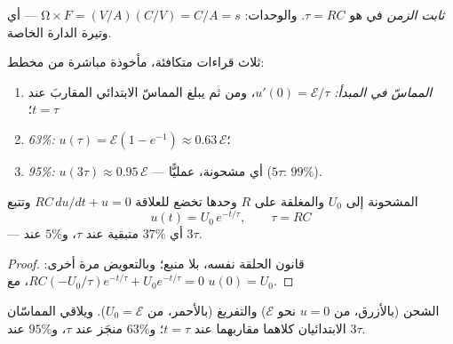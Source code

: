 \begin{definition}\label{def:g12:rc-rl-circuits:tau}
\emph{ثابت الزمن} في  هو
$\tau = RC$. والوحدات: $\unit{\ohm} \times \unit{F} =
(\unit{V/A})(\unit{C/V}) = \unit{C/A} = \unit{s}$ --- أي وتيرة
الدارة الخاصة.
\end{definition}

\begin{method}\label{met:g12:rc-rl-circuits:reading}
ثلاث قراءات متكافئة، مأخوذة مباشرة من مخطط:
\begin{enumerate}
  \item \emph{المماسّ في المبدأ:} $u'(0) = \mathcal{E}/\tau$، ومن ثم
        يبلغ المماسّ الابتدائي المقاربَ عند $t = \tau$؛
  \item \emph{63\%:} $u(\tau) = \mathcal{E}(1 - e^{-1}) \approx
        0.63\,\mathcal{E}$؛
  \item \emph{95\%:} $u(3\tau) \approx 0.95\,\mathcal{E}$ --- أي مشحونة،
        عمليًّا ($5\tau$: $99\%$).
\end{enumerate}
\end{method}

\begin{proposition}[التفريغ]\label{prop:g12:rc-rl-circuits:discharge}
 المشحونة إلى $U_0$ والمغلقة على  $R$ وحدها تخضع
للعلاقة $RC\,du/dt + u = 0$ وتتبع
\[
u(t) = U_0\,e^{-t/\tau}, \qquad \tau = RC
\]
--- أي $37\%$ متبقية عند $\tau$، و$5\%$ عند $3\tau$.
\end{proposition}

\begin{proof}
قانون الحلقة نفسه، بلا منبع؛ وبالتعويض مرة أخرى:
$RC(-U_0/\tau)e^{-t/\tau} + U_0 e^{-t/\tau} = 0$، مع $u(0) = U_0$.
\end{proof}

\begin{omfigure}

{\small الشحن (بالأزرق، من $u = 0$ نحو $\mathcal{E}$) والتفريغ
(بالأحمر، من $U_0 = \mathcal{E}$). ويلاقي المماسّان الابتدائيان كلاهما
مقاربهما عند $t = \tau$؛ و$63\%$ منجَز عند $\tau$، و$95\%$ عند $3\tau$.}
\end{omfigure}

